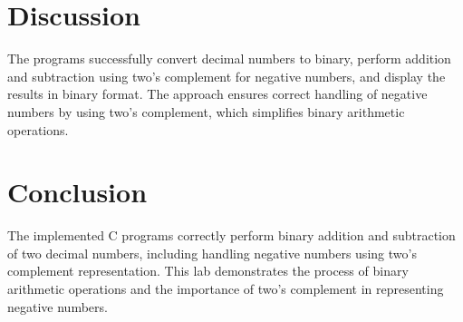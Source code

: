 \documentclass[a4paper,12pt]{article}
\begin{document}
\section*{Discussion}
The programs successfully convert decimal numbers to binary, perform addition and subtraction using two's complement for negative numbers, and display the results in binary format. The approach ensures correct handling of negative numbers by using two's complement, which simplifies binary arithmetic operations.

\section*{Conclusion}
The implemented C programs correctly perform binary addition and subtraction of two decimal numbers, including handling negative numbers using two's complement representation. This lab demonstrates the process of binary arithmetic operations and the importance of two's complement in representing negative numbers.
\end{document}
